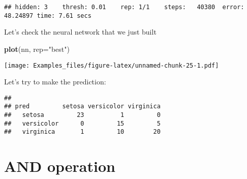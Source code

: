 \documentclass[]{article}
\newenvironment{Shaded}{\begin{snugshade}}{\end{snugshade}}
\newcommand{\DataTypeTok}[1]{\textcolor[rgb]{0.13,0.29,0.53}{#1}}
\newcommand{\DecValTok}[1]{\textcolor[rgb]{0.00,0.00,0.81}{#1}}
\newcommand{\KeywordTok}[1]{\textcolor[rgb]{0.13,0.29,0.53}{\textbf{#1}}}
\newcommand{\NormalTok}[1]{#1}
\newcommand{\OperatorTok}[1]{\textcolor[rgb]{0.81,0.36,0.00}{\textbf{#1}}}
\newcommand{\StringTok}[1]{\textcolor[rgb]{0.31,0.60,0.02}{#1}}
\begin{document}
\begin{verbatim}
## hidden: 3    thresh: 0.01    rep: 1/1    steps:   40380  error: 48.24897 time: 7.61 secs
\end{verbatim}

Let's check the neural network that we just built

\begin{Shaded}
\begin{Highlighting}[]
\KeywordTok{plot}\NormalTok{(nn, }\DataTypeTok{rep=}\StringTok{"best"}\NormalTok{)}
\end{Highlighting}
\end{Shaded}

\texttt{[image: Examples\_files/figure-latex/unnamed-chunk-25-1.pdf]}

Let's try to make the prediction:

\begin{Shaded}
\end{Shaded}

\begin{verbatim}
##             
## pred         setosa versicolor virginica
##   setosa         23          1         0
##   versicolor      0         15         5
##   virginica       1         10        20
\end{verbatim}

\hypertarget{and-operation}{%
\section{AND operation}\label{and-operation}}
\end{document}
